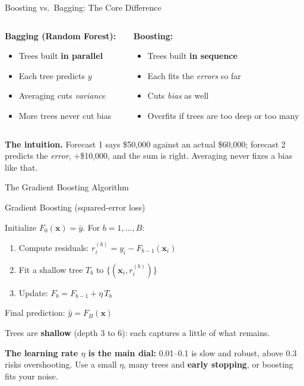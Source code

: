 \documentclass[aspectratio=169, 11pt]{beamer}
\begin{document}
\begin{frame}{Boosting vs.\ Bagging: The Core Difference}
  \begin{columns}[T]
    \begin{column}{0.48\textwidth}
      \textbf{Bagging (Random Forest):}
      \begin{itemize}\small\itemsep0pt
        \item Trees built \textbf{in parallel}
        \item Each tree predicts $y$
        \item Averaging cuts \emph{variance}
        \item More trees never cut bias
      \end{itemize}
    \end{column}
    \begin{column}{0.48\textwidth}
      \textbf{Boosting:}
      \begin{itemize}\small\itemsep0pt
        \item Trees built \textbf{in sequence}
        \item Each fits the \emph{errors} so far
        \item Cuts \emph{bias} as well
        \item Overfits if trees are too deep or too many
      \end{itemize}
    \end{column}
  \end{columns}

  \vspace{0.2cm}
  \textbf{The intuition.} Forecast 1 says \$50,000 against an actual \$60,000; forecast 2
  predicts the \emph{error}, $+$\$10,000, and the sum is right. Averaging never fixes a bias
  like that.
\end{frame}

\begin{frame}{The Gradient Boosting Algorithm}
  \begin{definitionbox}{Gradient Boosting (squared-error loss)}
    {\footnotesize
    Initialize $F_0(\mathbf{x}) = \bar{y}$. For $b = 1, \ldots, B$:
    \begin{enumerate}\itemsep0pt
      \item Compute residuals: $r_i^{(b)} = y_i - F_{b-1}(\mathbf{x}_i)$
      \item Fit a shallow tree $T_b$ to $\{(\mathbf{x}_i, r_i^{(b)})\}$
      \item Update: $F_b = F_{b-1} + \eta\, T_b$
    \end{enumerate}
    Final prediction: $\hat{y} = F_B(\mathbf{x})$
    }
  \end{definitionbox}
  Trees are \textbf{shallow} (depth 3 to 6): each captures a little of what remains.

  \vspace{0.15cm}
  \textbf{The learning rate $\eta$ is the main dial:} 0.01--0.1 is slow and robust, above 0.3
  risks overshooting. Use a small $\eta$, many trees and \textbf{early stopping}, or boosting
  fits your noise.
\end{frame}
\end{document}
